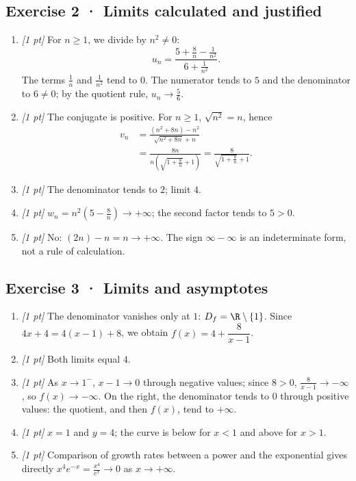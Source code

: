 \subsection*{Exercise 2 · Limits calculated and justified}\begin{enumerate}

\item \textit{[1 pt]} For $n\ge1$, we divide by $n^2\ne0$:
\[u_n=\frac{5+\frac{8}{n}-\frac{1}{n^2}}{6+\frac{1}{n^2}}.\]
The terms $\frac{1}{n}$ and $\frac{1}{n^2}$ tend to $0$. The numerator tends to $5$ and the denominator to $6\ne0$; by the quotient rule, $u_n\to\frac{5}{6}$.

\item \textit{[1 pt]} The conjugate is positive. For $n\ge1$, $\sqrt{n^2}=n$, hence
\[\begin{aligned}v_n&=\frac{(n^2+8n)-n^2}{\sqrt{n^2+8n}+n}\\&=\frac{8n}{n(\sqrt{1+\frac{8}{n}}+1)}=\frac{8}{\sqrt{1+\frac{8}{n}}+1}.\end{aligned}\]

\item \textit{[1 pt]} The denominator tends to $2$; limit $4$.

\item \textit{[1 pt]} $w_n=n^2(5-\frac{8}{n})\to+\infty$; the second factor tends to $5>0$.

\item \textit{[1 pt]} No: $(2n)-n=n\to+\infty$. The sign $\infty-\infty$ is an indeterminate form, not a rule of calculation.

\end{enumerate}

\subsection*{Exercise 3 · Limits and asymptotes}\begin{enumerate}

\item \textit{[1 pt]} The denominator vanishes only at $1$: $D_f=\R\setminus\{1\}$. Since $4x+4=4(x-1)+8$, we obtain $f(x)=4+\dfrac{8}{x-1}$.

\item \textit{[1 pt]} Both limits equal $4$.

\item \textit{[1 pt]} As $x\to 1^-$, $x-1\to0$ through negative values; since $8>0$, $\frac{8}{x-1}\to-\infty$, so $f(x)\to-\infty$. On the right, the denominator tends to $0$ through positive values: the quotient, and then $f(x)$, tend to $+\infty$.

\item \textit{[1 pt]} $x=1$ and $y=4$; the curve is below for $x<1$ and above for $x>1$.

\item \textit{[1 pt]} Comparison of growth rates between a power and the exponential gives directly $x^4e^{-x}=\frac{x^4}{e^x}\to0$ as $x\to+\infty$.

\end{enumerate}

